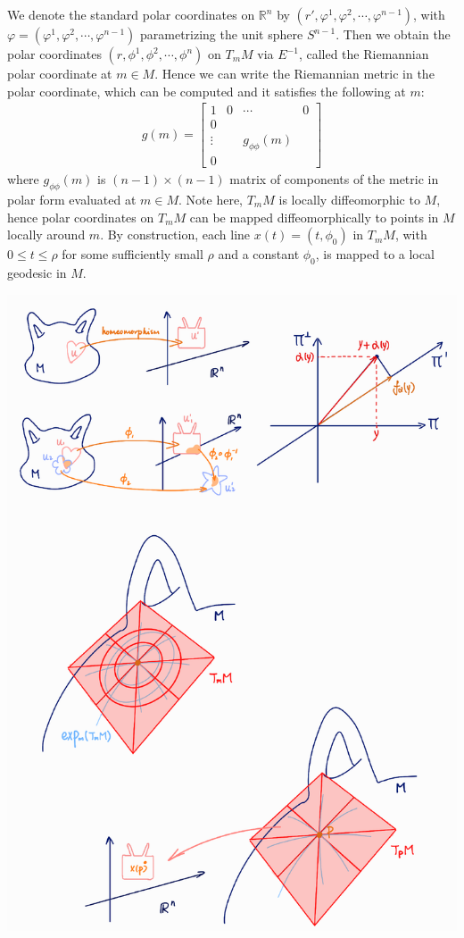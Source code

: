 \documentclass[11pt]{book}
\theoremstyle{break}
\theoremstyle{break}
\newcommand{\R}{\mathbb{R}}
\newcommand{\bmat}[1]{\begin{bmatrix} #1 \end{bmatrix}}
\begin{document}
We denote the standard polar coordinates on $\R^n$ by $(r',\varphi^1, \varphi^2,\cdots, \varphi^{n-1})$, with $\varphi = (\varphi^1,\varphi^2,\cdots, \varphi^{n-1})$ parametrizing the unit sphere $S^{n-1}$. Then we obtain the polar coordinates $(r,\phi^1,\phi^2,\cdots, \phi^n)$ on $T_mM$ via $E^{-1}$, called the Riemannian polar coordinate at $m \in M$. Hence we can write the Riemannian metric in the polar coordinate, which can be computed and it satisfies the following at $m$:
\begin{align*}
g(m) = \bmat{1& 0 & \cdots & 0\\
0& &   & \\
\vdots & & g_{\phi\phi}(m)  &\\
0& &   & }
\end{align*}
where $g_{\phi\phi}(m)$ is $(n-1)\times (n-1)$ matrix of components of the metric in polar form evaluated at $m\in M$. Note here, $T_mM$ is locally diffeomorphic to $M$, hence polar coordinates on $T_mM$ can be mapped diffeomorphically to points in $M$ locally around $m$. By construction, each line $x(t) = (t,\phi_0)$ in $T_mM$, with $0\leq t\leq \rho$ for some sufficiently small $\rho$ and a constant $\phi_0$, is mapped to a local geodesic in $M$. 
\begin{center}
\includegraphics[scale=0.69]{expMap}
\end{center}
\end{document}
